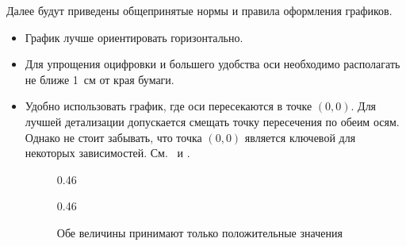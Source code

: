 Далее будут приведены общепринятые нормы и правила оформления графиков.
\begin{itemize}
    \item График лучше ориентировать горизонтально.
    \item Для упрощения оцифровки и большего удобства оси необходимо располагать не ближе 1~см от края бумаги.
    \item Удобно использовать график, где оси пересекаются в точке $(0,0)$. Для лучшей детализации допускается смещать точку пересечения по обеим осям. Однако не стоит забывать, что точка $(0,0)$ является ключевой для некоторых зависимостей. См.~ и .
\begin{figure}[h]
    \hfill
    \begin{subcaptionblock}{0.46\tw}
        \centering
        \caption{Обе величины принимают только положительные значения}
    \end{subcaptionblock}
    \hfill
    \begin{subcaptionblock}{0.46\tw}
        \centering
\end{subcaptionblock}
\end{figure}
\end{itemize}
